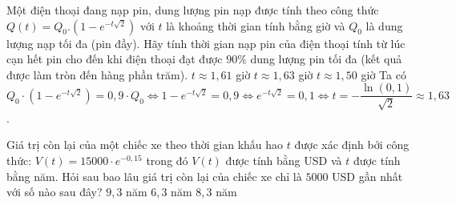 \begin{ex} %
	Một điện thoại đang nạp pin, dung lượng pin nạp được tính theo công thức $Q\left( t \right)={Q_0}.\left( 1-{e^{-t\sqrt {2}}} \right)$ với $ t$ là khoảng thời gian tính bằng giờ và ${Q_0}$ là dung lượng nạp tối đa (pin đầy). Hãy tính thời gian nạp pin của điện thoại tính từ lúc cạn hết pin cho đến khi điện thoại đạt được $90\%$ dung lượng pin tối đa (kết quả được làm tròn đến hàng phần trăm).
	 { $ t\approx 1{,}61$ giờ} {\True $ t\approx 1{,}63$ giờ} { $ t\approx 1{,}50$ giờ}
	\loigiai
	{Ta có\\
		${Q_0}\cdot \left( 1-{e^{-t\sqrt {2}}} \right)=0{,}9\cdot {Q_0}\Leftrightarrow 1-{e^{-t\sqrt {2}}}=0{,}9\Leftrightarrow {e^{-t\sqrt {2}}}=0{,}1\Leftrightarrow t=-\dfrac{\ln ( 0{,}1 )}{\sqrt {2}}\approx 1{,}63$.}
	
\end{ex}
\begin{ex} %
	Giá trị còn lại của một chiếc xe theo thời gian khấu hao $t$ được xác định bởi công thức: $V(t)=15000 \cdot {{e}^{-0{,}15}}$ trong đó $V(t)$  được tính bằng USD và $t$  được tính bằng năm. Hỏi sau bao lâu giá trị còn lại của chiếc xe chỉ là $5000$ USD gần nhất với số nào sau đây?
	 { $9{,}3$  năm} { $6{,}3$  năm} { $8{,}3$  năm}
\end{ex}
